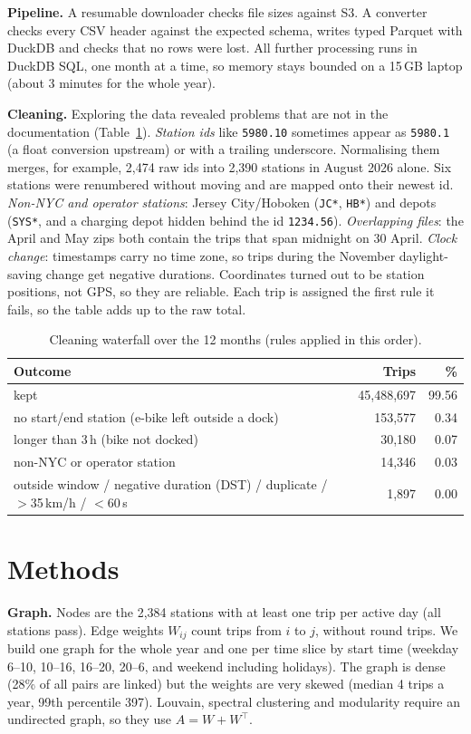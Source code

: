 \documentclass[10pt,a4paper]{article}
\begin{document}
\textbf{Pipeline.} A resumable downloader checks file sizes against S3.
A converter checks every CSV header against the expected schema, writes typed Parquet with DuckDB and checks that no rows were lost.
All further processing runs in DuckDB SQL, one month at a time, so memory stays bounded on a 15\,GB laptop (about 3 minutes for the whole year).

\textbf{Cleaning.} Exploring the data revealed problems that are not in the documentation (Table~\ref{tab:clean}).
\emph{Station ids} like \texttt{5980.10} sometimes appear as \texttt{5980.1} (a float conversion upstream) or with a trailing underscore.
Normalising them merges, for example, 2,474 raw ids into 2,390 stations in August 2026 alone.
Six stations were renumbered without moving and are mapped onto their newest id.
\emph{Non-NYC and operator stations}: Jersey City/Hoboken (\texttt{JC*}, \texttt{HB*}) and depots (\texttt{SYS*}, and a charging depot hidden behind the id \texttt{1234.56}).
\emph{Overlapping files}: the April and May zips both contain the trips that span midnight on 30 April.
\emph{Clock change}: timestamps carry no time zone, so trips during the November daylight-saving change get negative durations.
Coordinates turned out to be station positions, not GPS, so they are reliable.
Each trip is assigned the first rule it fails, so the table adds up to the raw total.

\begin{table}[h]\centering\small
\caption{Cleaning waterfall over the 12 months (rules applied in this order).}\label{tab:clean}
\begin{tabular}{lrr}\toprule
Outcome & Trips & \% \\\midrule
kept & 45,488,697 & 99.56\\
no start/end station (e-bike left outside a dock) & 153,577 & 0.34\\
longer than 3\,h (bike not docked) & 30,180 & 0.07\\
non-NYC or operator station & 14,346 & 0.03\\
outside window / negative duration (DST) / duplicate / $>$35\,km/h / $<$60\,s & 1,897 & 0.00\\\bottomrule
\end{tabular}
\end{table}

\section{Methods}
\textbf{Graph.} Nodes are the 2,384 stations with at least one trip per active day (all stations pass).
Edge weights $W_{ij}$ count trips from $i$ to $j$, without round trips.
We build one graph for the whole year and one per time slice by start time (weekday 6--10, 10--16, 16--20, 20--6, and weekend including holidays).
The graph is dense (28\% of all pairs are linked) but the weights are very skewed (median 4 trips a year, 99th percentile 397).
Louvain, spectral clustering and modularity require an undirected graph, so they use $A=W+W^\top$.
\end{document}
